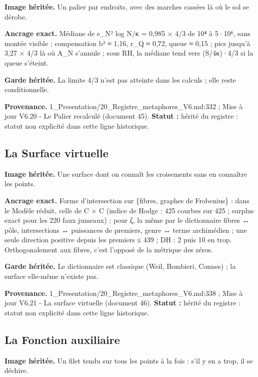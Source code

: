 \documentclass[
  9pt,
  a4paper,
]{article}
\begin{document}
\textbf{Image héritée.} Un palier par endroits, avec des marches cassées
là où le sol se dérobe.

\textbf{Ancrage exact.} Médiane de e\_N² log N/κ = 0,985 × 4/3 de 10⁴ à
5·10⁶, sans montée visible ; compensation b² ≈ 1,16, r\_Q ≈ 0,72, queue
≈ 0,15 ; pics jusqu'à 3,27 × 4/3 là où A\_N s'annule ; sous RH, la
médiane tend vers (S/4κ)·4/3 si la queue s'éteint.

\textbf{Garde héritée.} La limite 4/3 n'est pas atteinte dans les
calculs ; elle reste conditionnelle.

\textbf{Provenance.} 1\_Presentation/20\_Registre\_metaphores\_V6.md:332
; Mise à jour V6.20 - Le Palier recalculé (document 45). \textbf{Statut
:} hérité du registre : statut non explicité dans cette ligne
historique.

\hypertarget{la-surface-virtuelle}{%
\subsection{La Surface virtuelle}\label{la-surface-virtuelle}}

\textbf{Image héritée.} Une surface dont on connaît les croisements sans
en connaître les points.

\textbf{Ancrage exact.} Forme d'intersection sur \{fibres, graphes de
Frobenius\} : dans le Modèle réduit, celle de C × C (indice de Hodge :
425 courbes sur 425 ; surplus exact pour les 220 faux jumeaux) ; pour ζ,
la même par le dictionnaire fibres ↔ pôle, intersections ↔ puissances de
premiers, genre ↔ terme archimédien ; une seule direction positive
depuis les premiers ≤ 439 ; DH : 2 puis 10 en trop. Orthogonalement aux
fibres, c'est l'opposé de la métrique des zéros.

\textbf{Garde héritée.} Le dictionnaire est classique (Weil, Bombieri,
Connes) ; la surface elle-même n'existe pas.

\textbf{Provenance.} 1\_Presentation/20\_Registre\_metaphores\_V6.md:338
; Mise à jour V6.21 - La surface virtuelle (document 46). \textbf{Statut
:} hérité du registre : statut non explicité dans cette ligne
historique.

\hypertarget{la-fonction-auxiliaire}{%
\subsection{La Fonction auxiliaire}\label{la-fonction-auxiliaire}}

\textbf{Image héritée.} Un filet tendu sur tous les points à la fois :
s'il y en a trop, il se déchire.
\end{document}
